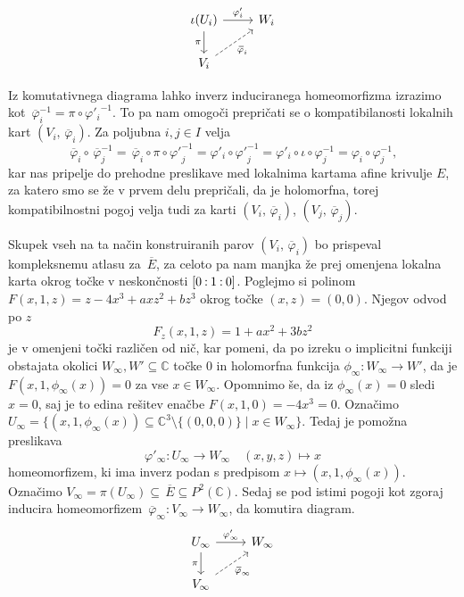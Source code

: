 \documentclass[mat1]{fmfdelo}
\newcommand{\C}{\mathbb C}
\newcommand{\PC}{P^2(\mathbb C)}
\newcommand{\inv}{^{-1}}
\newcommand{\pcoor}[1]{%
\begingroup\lccode`~=`: \lowercase{\endgroup
\edef~}{\mathbin{\mathchar\the\mathcode`:}\nobreak}%
\left[%
\begingroup
\mathcode`:=\string"8000
#1%
\endgroup
\right]%
}
\newcommand{\olsi}[1]{\,\overline{\!{#1}}} %
\theoremstyle{definition}
\begin{document}
\begin{equation}
    \label{projektivna karta diagram}    
    \begin{tikzcd}
        \iota(U_i) \arrow{r}{\varphi'_i} \ar[labels=left]{d}{\pi} & W_i \\
        V_i \ar[dashed, labels=below right]{ur}{\olsi{\varphi}_i} 
    \end{tikzcd}
\end{equation}    


Iz komutativnega diagrama lahko inverz induciranega homeomorfizma izrazimo kot $\olsi{\varphi}_i\inv = \pi \circ {\varphi'_i}\inv$. To pa nam omogoči prepričati se o kompatibilanosti lokalnih kart $(V_i, \olsi{\varphi}_i)$.
Za poljubna $i,j \in I$ velja
\[
    \olsi{\varphi}_i \circ \olsi{\varphi}_j\inv = 
    \olsi{\varphi}_i \circ \pi \circ {\varphi'}_j\inv = 
    \varphi'_i \circ {\varphi'}_j\inv = 
    \varphi'_i \circ \iota \circ \varphi_j\inv = 
    \varphi_i \circ \varphi_j\inv,
\]
kar nas pripelje do prehodne preslikave med lokalnima kartama afine krivulje $E$, za katero smo se že v prvem delu prepričali, da je holomorfna, torej kompatibilnostni pogoj velja tudi za karti $(V_i, \olsi{\varphi}_i)$, $(V_j, \olsi{\varphi}_j)$.

Skupek vseh na ta način konstruiranih parov $(V_i, \olsi{\varphi}_i)$ bo prispeval kompleksnemu atlasu za $\olsi{E}$, za celoto pa nam manjka že prej omenjena lokalna karta okrog točke v neskončnosti $\pcoor{0 : 1 : 0}$. Poglejmo si polinom $F(x, 1, z) = z - 4x^3 + axz^2 + bz^3$ okrog točke $(x,z) = (0,0)$. Njegov odvod po $z$ 
\[
    F_z(x,1,z) = 1 + ax^2 + 3bz^2
\]
je v omenjeni točki različen od nič, kar pomeni, da po izreku o implicitni funkciji obstajata okolici $W_\infty, W' \subseteq \C$ točke $0$ in holomorfna funkcija $\phi_\infty : W_\infty \to W'$, da je $F(x, 1, \phi_\infty(x)) = 0$ za vse $x \in W_\infty$. Opomnimo še, da iz $\phi_\infty(x) = 0$ sledi $x = 0$, saj je to edina rešitev enačbe $F(x, 1, 0) = -4x^3 = 0$. Označimo $U_\infty = \{(x, 1, \phi_\infty(x)) \subseteq \C^3 \setminus \{(0,0,0)\}\mid x \in W_\infty\}$. Tedaj je pomožna preslikava 
\[
    \varphi'_\infty : U_\infty \to W_\infty \quad (x,y,z) \mapsto x
\]
homeomorfizem, ki ima inverz podan s predpisom $x \mapsto (x,1,\phi_\infty(x))$. Označimo $V_\infty = \pi(U_\infty) \subseteq \olsi{E} \subseteq \PC$. Sedaj se pod istimi pogoji kot zgoraj inducira homeomorfizem $\olsi{\varphi}_\infty : V_\infty \to W_\infty$, da komutira diagram.
\begin{equation}
    \label{projektivna karta v inf diagram}    
    \begin{tikzcd}
        U_\infty \arrow{r}{\varphi'_\infty} \ar[labels=left]{d}{\pi} & W_\infty \\
        V_\infty \ar[dashed, labels=below right]{ur}{\olsi{\varphi}_\infty}
    \end{tikzcd}
\end{equation}   
\end{document}
